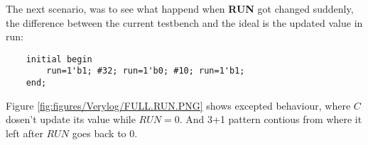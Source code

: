 The next scenario, was to see what happend when \textbf{RUN} got changed suddenly, the difference between the current testbench and the ideal is the updated value in run:
\begin{lstlisting}
	initial begin  
		run=1'b1; #32; run=1'b0; #10; run=1'b1;
	end;
\end{lstlisting}
Figure \ref{fig:figures/Verylog/FULL.RUN.PNG} shows excepted behaviour, where $C$ dosen't update its value while $RUN=0$. And 3+1 pattern contious from where it left after $RUN$ goes back to 0. 
